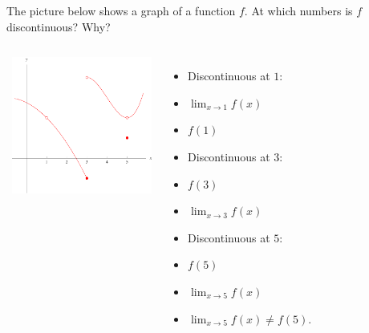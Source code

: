 \begin{frame}
\begin{example}[Example 1, p. 113]
The picture below shows a graph of a function $f$.  \alert<handout:0 |2-3>{At which numbers is $f$ discontinuous?}  \alert<handout:0 |4->{Why?}
\begin{columns}[c]
\ \includegraphics[height=4.5cm]{continuity/pictures/02-05-ex1.pdf}%
\begin{itemize}
\item<3->  Discontinuous at $1$:
\item<4->  \alert<handout:0 |5-6>{$\lim_{x\rightarrow 1}f(x)$ }
\item<4->  \alert<handout:0 |7-8>{$f(1)$ }
\item<3->  Discontinuous at $3$:
\item<4->  \alert<handout:0 |9-10>{$f(3)$ }
\item<4->  \alert<handout:0 |11-12>{$\lim_{x\rightarrow 3}f(x)$ }
\item<3->  Discontinuous at $5$:
\item<4->  \alert<handout:0 |13-14>{$f(5)$ }
\item<4->  \alert<handout:0 |15-16>{$\lim_{x\rightarrow 5}f(x)$ }
\item<17-| alert@17>  $\lim_{x\rightarrow 5}f(x) \neq f(5)$.
\end{itemize}
\end{columns}
\end{example}
\end{frame}
